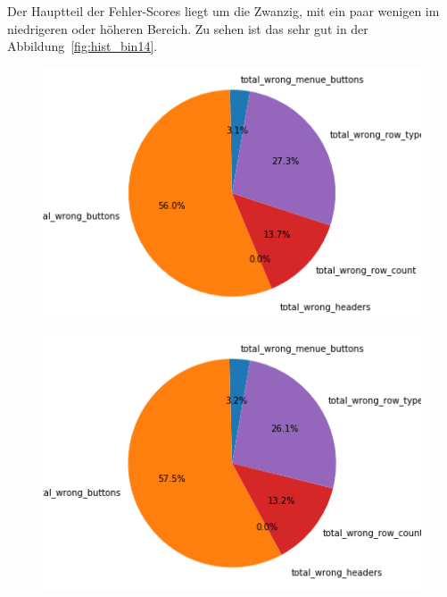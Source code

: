 \documentclass[pdftex,a4paper,halfparskip, article]{scrartcl}
\begin{document}
Der Hauptteil der Fehler-Scores liegt um die Zwanzig, mit ein paar wenigen im niedrigeren oder höheren Bereich. Zu sehen ist das sehr gut in der Abbildung~\ref{fig:hist_bin14}. 

\begin{figure}
\centering
\begin{minipage}{.33\textwidth}
  \centering
  \includegraphics[width=1\linewidth]{predictions_bin14_total_error_types_pie_chart}
  \label{fig:fehler_gesamt_bin14}
\end{minipage}%
\begin{minipage}{.33\textwidth}
  \centering
  \includegraphics[width=1\linewidth]{predictions_bin14_excluded_p80_error_types_pie_chart}
  \label{fig:fehler_beste80_bin14}
\end{minipage}
\begin{minipage}{.33\textwidth}

\end{minipage}
\end{figure}
\end{document}
